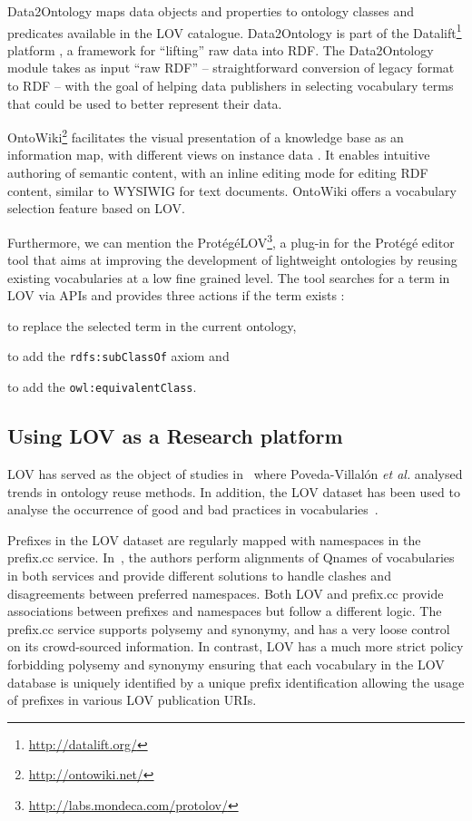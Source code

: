 \documentclass{iosart2c}
\begin{document}
Data2Ontology maps data objects and properties to ontology classes and predicates available in the LOV catalogue. Data2Ontology is part of the  Datalift\footnote{\url{http://datalift.org/}} platform \cite{scharffe_2012}, a framework for ``lifting'' raw data into RDF. The Data2Ontology module takes as input ``raw RDF'' -- straightforward conversion of legacy format to RDF -- with the goal of helping data publishers in selecting vocabulary terms that could be used to better represent their data.


OntoWiki\footnote{\url{http://ontowiki.net/}} facilitates the visual presentation of a knowledge base as an information map, with different views on instance data \cite{auer2006ontowiki}. It enables intuitive authoring of semantic content, with an inline editing mode for editing RDF content, similar to WYSIWIG for text documents. OntoWiki offers a vocabulary selection feature based on LOV.

Furthermore, we can mention the Prot{\'e}g{\'e}LOV\footnote{\url{http://labs.mondeca.com/protolov/}}, a plug-in for the Prot{\'e}g{\'e} editor tool \cite{prolov2015} that aims at improving the development of lightweight ontologies by reusing existing vocabularies at a low fine grained level. The tool searches for a term in LOV via APIs and provides three actions if the term exists : 
\begin{inparaenum}[1)] 
 \item to replace the selected term in the current ontology, 
 \item to add the {\small\texttt{rdfs:subClassOf}} axiom and 
 \item to add the {\small\texttt{owl:equivalentClass}}.
\end{inparaenum}



\subsection{Using LOV as a Research platform}

LOV has served as the object of studies in~\cite{poveda2012landscape} where Poveda-Villal\'on \emph{et al.} analysed trends in ontology reuse methods. In addition, the LOV dataset has been used to analyse the occurrence of good and bad practices in vocabularies~\cite{poveda2013detecting}.

Prefixes in the LOV dataset are regularly mapped with namespaces in the prefix.cc service. In~\cite{wasabi13}, the authors perform alignments of Qnames of vocabularies in both services and provide different solutions to handle clashes and disagreements between preferred namespaces. Both LOV and prefix.cc provide associations between prefixes and namespaces but follow a different logic. The prefix.cc service supports polysemy and synonymy, and has a very loose control on its crowd-sourced information. In contrast, LOV has a much more strict policy forbidding polysemy and synonymy ensuring that each vocabulary in the LOV database is uniquely identified by a unique prefix identification allowing the usage of prefixes in various LOV publication URIs. 
\end{document}
